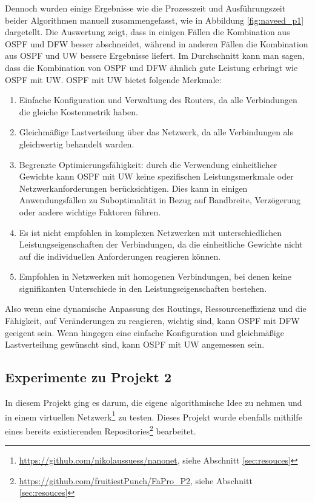\documentclass[sigconf, nonacm, review]{acmart}
\begin{document}
Dennoch wurden einige Ergebnisse wie die Prozesszeit und Ausf\"uhrungszeit beider Algorithmen manuell zusammengefasst, 
wie in Abbildung \ref{fig:naveed_p1} dargetellt. 
Die Auswertung zeigt, dass in einigen F\"allen die Kombination aus OSPF und DFW besser abschneidet, 
w\"ahrend in anderen F\"allen die Kombination aus OSPF und UW bessere Ergebnisse liefert. 
Im Durchschnitt kann man sagen, dass die Kombination von OSPF und DFW \"ahnlich gute Leistung erbringt wie OSPF mit UW.\newline
OSPF mit UW bietet folgende Merkmale:
\begin{enumerate}
\item Einfache Konfiguration und Verwaltung des Routers, da alle Verbindungen die gleiche Kostenmetrik haben.
\item Gleichm\"a\ss ige Lastverteilung \"uber das Netzwerk, da alle Verbindungen als gleichwertig behandelt warden.
\item Begrenzte Optimierungsf\"ahigkeit: 
durch die Verwendung einheitlicher Gewichte kann OSPF mit UW  keine spezifischen Leistungsmerkmale oder Netzwerkanforderungen ber\"ucksichtigen. 
Dies kann in einigen Anwendungsf\"allen zu Suboptimalit\"at in Bezug auf Bandbreite,
Verz\"ogerung oder andere wichtige Faktoren f\"uhren.
\item Es ist nicht empfohlen in komplexen Netzwerken mit unterschiedlichen Leistungseigenschaften der Verbindungen, 
da die einheitliche Gewichte nicht auf die individuellen Anforderungen reagieren k\"onnen.
\item Empfohlen in Netzwerken mit homogenen Verbindungen, bei denen keine signifikanten Unterschiede in den Leistungseigenschaften bestehen.
\end{enumerate}
Also wenn eine dynamische Anpassung des Routings, Ressourceneffizienz und die F\"ahigkeit, 
auf Ver\"anderungen zu reagieren, wichtig sind, kann OSPF mit DFW geeigent sein. 
Wenn hingegen eine einfache Konfiguration und gleichm\"a\ss ige Lastverteilung gew\"unscht sind, kann OSPF mit UW angemessen sein.
\subsection{Experimente zu Projekt 2}
In diesem Projekt ging es darum, die eigene algorithmische Idee zu nehmen und in einem virtuellen Netzwerk\footnote{\url{https://github.com/nikolaussuess/nanonet}, siehe Abschnitt \ref{sec:resouces}} zu testen. 
Dieses Projekt wurde ebenfalls mithilfe eines bereits existierenden Repositories\footnote{\url{https://github.com/fruitiestPunch/FaPro_P2}, siehe Abschnitt \ref{sec:resouces}} bearbeitet.
\end{document}
